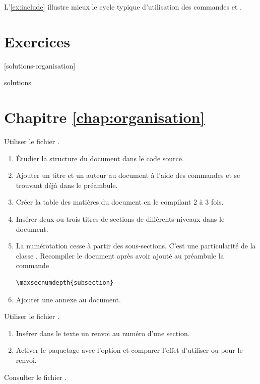 L'\autoref{ex:include} illustre mieux le cycle typique
d'utilisation des commandes \cmd{} et \cmd{}.




\section{Exercices}
\label{sec:organisation:exercices}

[solutions-organisation]

\begin{Filesave}{solutions}
\section*{Chapitre \ref*{chap:organisation}}

\end{Filesave}

\begin{exercice}[nosol]
  Utiliser le fichier .
  \begin{enumerate}
  \item Étudier la structure du document dans le code source.
  \item Ajouter un titre et un auteur au document à l'aide des
    commandes \cmdprint{\title} et \cmdprint{\author} se trouvant déjà
    dans le préambule.
  \item Créer la table des matières du document en le compilant 2 à 3
    fois.
  \item Insérer deux ou trois titres de sections de différents niveaux
    dans le document.
  \item La numérotation cesse à partir des sous-sections. C'est une
    particularité de la classe . Recompiler le document
    après avoir ajouté au préambule la commande
\begin{lstlisting}
\maxsecnumdepth{subsection}
\end{lstlisting}
  \item Ajouter une annexe au document.
  \end{enumerate}
\end{exercice}

\begin{exercice}[nosol]
  Utiliser le fichier .
  \begin{enumerate}
  \item Insérer dans le texte un renvoi au numéro d'une section.
  \item Activer le paquetage  avec l'option
     et comparer l'effet d'utiliser \cmd{\ref} ou
    \cmd{\autoref} pour le renvoi.
  \end{enumerate}
  \begin{sol}
    Consulter le fichier .
  \end{sol}
\end{exercice}

